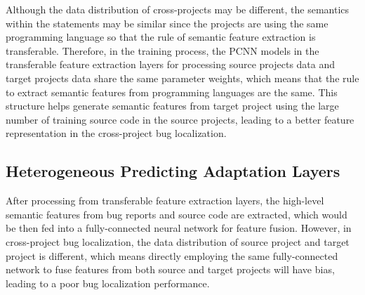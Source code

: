 
Although the data distribution of cross-projects may be different, the semantics within the statements may be similar since the projects are using the same programming language so that the rule of semantic feature extraction is transferable. Therefore, in the training process, the PCNN models in the transferable feature extraction layers for processing source projects data and target projects data share the same parameter weights, which means that the rule to extract semantic features from programming languages are the same. This structure helps generate semantic features from target project using the large number of training source code in the source projects, leading to a better feature representation in the cross-project bug localization. 
 
\subsection{Heterogeneous Predicting Adaptation Layers}
After processing from transferable feature extraction layers, the high-level semantic features from bug reports and source code are extracted, which would be then fed into a fully-connected neural network for feature fusion. However, in cross-project bug localization, the data distribution of source project and target project is different, which means directly employing the same fully-connected network to fuse features from both source and target projects will have bias, leading to a poor bug localization performance.

